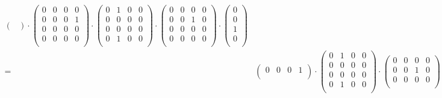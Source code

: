 \begin{align*}
\begin{pmatrix}
        \end{pmatrix}
        \cdot
        \begin{pmatrix}
            0 & 0 & 0 & 0\\
            0 & 0 & 0 & 1\\
            0 & 0 & 0 & 0\\
            0 & 0 & 0 & 0\\
        \end{pmatrix}
        \cdot
        \begin{pmatrix}
            0 & 1 & 0 & 0\\
            0 & 0 & 0 & 0\\
            0 & 0 & 0 & 0\\
            0 & 1 & 0 & 0\\
        \end{pmatrix}
        \cdot
        \begin{pmatrix}
            0 & 0 & 0 & 0\\
            0 & 0 & 1 & 0\\
            0 & 0 & 0 & 0\\
            0 & 0 & 0 & 0\\
        \end{pmatrix}
        \cdot
        \begin{pmatrix}
            0\\
            0\\
            1\\
            0\\
        \end{pmatrix}
        \\
    = & 
        \begin{pmatrix}
            0 & 0 & 0 & 1\\
        \end{pmatrix}
        \cdot
        \begin{pmatrix}
            0 & 1 & 0 & 0\\
            0 & 0 & 0 & 0\\
            0 & 0 & 0 & 0\\
            0 & 1 & 0 & 0\\
        \end{pmatrix}
        \cdot
        \begin{pmatrix}
            0 & 0 & 0 & 0\\
            0 & 0 & 1 & 0\\
            0 & 0 & 0 & 0\\

\end{pmatrix}
\end{align*}
